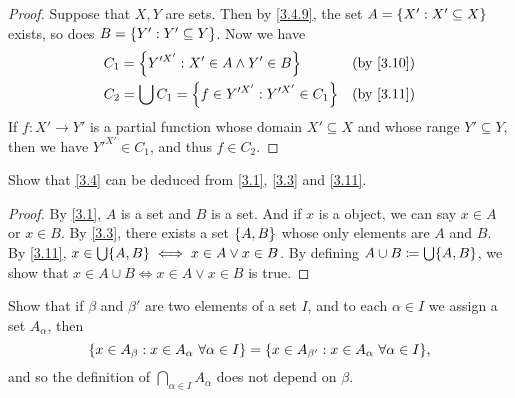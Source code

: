 \begin{proof}
  Suppose that \(X, Y\) are sets.
  Then by \cref{3.4.9}, the set \(A = \left\lbrace X' : X' \subseteq X\right\rbrace\) exists, so does \(B = \left\lbrace Y' : Y' \subseteq Y\right\rbrace\).
  Now we have
  \begin{align*}
    C_1 & = \set{Y'^{X'} : X' \in A \land Y' \in B}             &  & \text{(by \cref{3.10})} \\
    C_2 & = \bigcup C_1 = \set{f \in Y'^{X'} : Y'^{X'} \in C_1} &  & \text{(by \cref{3.11})} \\
  \end{align*}
  If \(f : X' \to Y'\) is a partial function whose domain \(X' \subseteq X\) and whose range \(Y' \subseteq Y\), then we have \(Y'^{X'} \in C_1\), and thus \(f \in C_2\).
\end{proof}

\begin{ex}\label{ex:3.4.8}
  Show that \cref{3.4} can be deduced from \cref{3.1}, \cref{3.3} and \cref{3.11}.
\end{ex}

\begin{proof}
  By \cref{3.1}, \(A\) is a set and \(B\) is a set.
  And if \(x\) is a object, we can say \(x \in A\) or \(x \in B\).
  By \cref{3.3}, there exists a set \(\left\lbrace A, B\right\rbrace\) whose only elements are \(A\) and \(B\).
  By \cref{3.11}, \(x \in \bigcup \set{A, B} \iff x \in A \lor x \in B\).
  By defining \(A \cup B \coloneqq \bigcup \set{A, B}\), we show that \(x \in A \cup B \iff x \in A \lor x \in B\) is true.
\end{proof}

\begin{ex}\label{ex:3.4.9}
  Show that if \(\beta\) and \(\beta'\) are two elements of a set \(I\), and to each \(\alpha \in I\) we assign a set \(A_{\alpha}\), then
  \[
    \set{x \in A_{\beta} : x \in A_{\alpha} \ \forall \alpha \in I} = \set{x \in A_{\beta'} : x \in A_{\alpha} \ \forall \alpha \in I},
  \]
  and so the definition of \(\bigcap_{\alpha \in I} A_{\alpha}\) does not depend on \(\beta\).
\end{ex}

